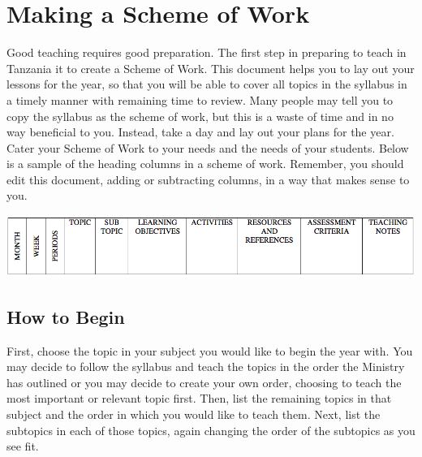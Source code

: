 \chapter{Making a Scheme of Work}
Good teaching requires good preparation.  The first step in preparing to teach in Tanzania it to create a Scheme of Work. This document helps you to lay out your lessons for the year, so that you will be able to cover all topics in the syllabus in a timely manner with remaining time to review.  Many people may tell you to copy the syllabus as the scheme of work, but this is a waste of time and in no way beneficial to you.  Instead, take a day and lay out your plans for the year.   Cater your Scheme of Work to your needs and the needs of your students. Below is a sample of the heading columns in a scheme of work. Remember, you should edit this document, adding or subtracting columns, in a way that makes sense to you.

\vspace{-0.8in}
\begin{flushleft}
\includegraphics[scale=0.65]{./img/picture-1.png} 
\end{flushleft}


\section{How to Begin}
First, choose the topic in your subject you would like to begin the year with.  You may decide to follow the syllabus and teach the topics in the order the Ministry has outlined or you may decide to create your own order, choosing to teach the most important or relevant topic first.  Then, list the remaining topics in that subject and the order in which you would like to teach them.  Next, list the subtopics in each of those topics, again changing the order of the subtopics as you see fit.\\

